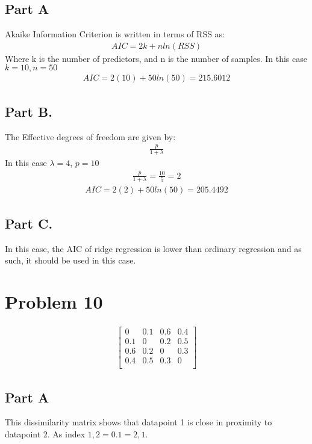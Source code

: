 \documentclass{article}
\begin{document}
\subsection*{Part A}
Akaike Information Criterion is written in terms of RSS as:
\begin{align*}
AIC = 2k + n ln(RSS)
\end{align*}
Where k is the number of predictors, and n is the number of samples. In this case $k=10, n=50$
\begin{align*}
AIC = 2(10) + 50 ln(50) = 215.6012
\end{align*}
\subsection*{Part B.}
The Effective degrees of freedom are given by:
\begin{align*}
\frac{p}{1+\lambda}
\end{align*}
In this case $\lambda=4$, $p=10$
\begin{align*}
\frac{p}{1+\lambda} = \frac{10}{5} = 2
\end{align*}
\begin{align*}
AIC = 2(2) + 50 ln(50) = 205.4492
\end{align*}
\subsection*{Part C.}
In this case, the AIC of ridge regression is lower than ordinary regression and as such, it should be used in this case.

\clearpage

\section*{Problem 10}
\begin{align*}
\begin{bmatrix}
0   & 0.1 & 0.6 & 0.4 \\
0.1 &  0  & 0.2 & 0.5 \\
0.6 & 0.2 &  0  & 0.3 \\
0.4 & 0.5 & 0.3 &   0 \\
\end{bmatrix}
\end{align*}

\subsection*{Part A}
This dissimilarity matrix shows that datapoint 1 is close in proximity to datapoint 2. As index $1,2 = 0.1 = 2,1$.
\end{document}
